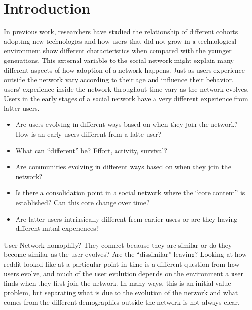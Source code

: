 \section{Introduction}

In previous work, researchers have studied the relationship of different cohorts adopting new technologies and how users that did not grow in a technological environment show different characteristics when compared with the younger generations. This external variable to the social network might explain many different aspects of how adoption of a network happens. Just as users experience outside the network vary according to their age and influence their behavior, users' experience inside the network throughout time vary as the network evolves. Users in the early stages of a social network have a very different experience from latter users.

\begin{itemize}
	\item Are users evolving in different ways based on when they join the network? How is an early users different from a latte user?
	\item What can ``different'' be? Effort, activity, survival?
	\item Are communities evolving in different ways based on when they join the network?
	\item Is there a consolidation point in a social network where the ``core content'' is established? Can this core change over time?
	\item Are latter users intrinsically different from earlier users or are they having different initial experiences?
\end{itemize}

User-Network homophily? They connect because they are similar or do they become similar as the user evolves? Are the ``dissimilar'' leaving?
Looking at how reddit looked like at a particular point in time is a different question from how users evolve, and much of the user evolution depends on the environment a user finds when they first join the network. In many ways, this is an initial value problem, but separating what is due to the evolution of the network and what comes from the different demographics outside the network is not always clear.

